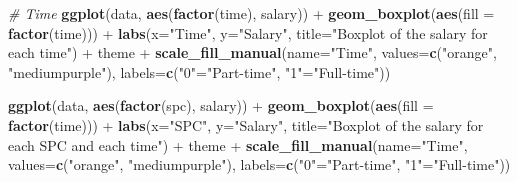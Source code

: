 \documentclass[]{article}
\newenvironment{Shaded}{\begin{snugshade}}{\end{snugshade}}
\newcommand{\KeywordTok}[1]{\textcolor[rgb]{0.13,0.29,0.53}{\textbf{{#1}}}}
\newcommand{\DataTypeTok}[1]{\textcolor[rgb]{0.13,0.29,0.53}{{#1}}}
\newcommand{\StringTok}[1]{\textcolor[rgb]{0.31,0.60,0.02}{{#1}}}
\newcommand{\CommentTok}[1]{\textcolor[rgb]{0.56,0.35,0.01}{\textit{{#1}}}}
\newcommand{\NormalTok}[1]{{#1}}
\begin{document}
\begin{Shaded}
\begin{Highlighting}[]
\CommentTok{# Time}
\KeywordTok{ggplot}\NormalTok{(data, }\KeywordTok{aes}\NormalTok{(}\KeywordTok{factor}\NormalTok{(time), salary)) +}\StringTok{ }\KeywordTok{geom_boxplot}\NormalTok{(}\KeywordTok{aes}\NormalTok{(}\DataTypeTok{fill =} \KeywordTok{factor}\NormalTok{(time))) +}
\StringTok{  }\KeywordTok{labs}\NormalTok{(}\DataTypeTok{x=}\StringTok{"Time"}\NormalTok{, }\DataTypeTok{y=}\StringTok{"Salary"}\NormalTok{, }\DataTypeTok{title=}\StringTok{"Boxplot of the salary for each time"}\NormalTok{) +}\StringTok{ }\NormalTok{theme +}
\StringTok{  }\KeywordTok{scale_fill_manual}\NormalTok{(}\DataTypeTok{name=}\StringTok{"Time"}\NormalTok{, }\DataTypeTok{values=}\KeywordTok{c}\NormalTok{(}\StringTok{"orange"}\NormalTok{, }\StringTok{"mediumpurple"}\NormalTok{), }\DataTypeTok{labels=}\KeywordTok{c}\NormalTok{(}\StringTok{"0"}\NormalTok{=}\StringTok{"Part-time"}\NormalTok{, }
  \StringTok{"1"}\NormalTok{=}\StringTok{"Full-time"}\NormalTok{))}
  
\KeywordTok{ggplot}\NormalTok{(data, }\KeywordTok{aes}\NormalTok{(}\KeywordTok{factor}\NormalTok{(spc), salary)) +}\StringTok{ }\KeywordTok{geom_boxplot}\NormalTok{(}\KeywordTok{aes}\NormalTok{(}\DataTypeTok{fill =} \KeywordTok{factor}\NormalTok{(time))) +}
\StringTok{  }\KeywordTok{labs}\NormalTok{(}\DataTypeTok{x=}\StringTok{"SPC"}\NormalTok{, }\DataTypeTok{y=}\StringTok{"Salary"}\NormalTok{, }\DataTypeTok{title=}\StringTok{"Boxplot of the salary for each SPC and each time"}\NormalTok{) +}\StringTok{ }
\StringTok{  }\NormalTok{theme +}\StringTok{ }\KeywordTok{scale_fill_manual}\NormalTok{(}\DataTypeTok{name=}\StringTok{"Time"}\NormalTok{, }\DataTypeTok{values=}\KeywordTok{c}\NormalTok{(}\StringTok{"orange"}\NormalTok{, }\StringTok{"mediumpurple"}\NormalTok{), }\DataTypeTok{labels=}\KeywordTok{c}\NormalTok{(}\StringTok{"0"}\NormalTok{=}\StringTok{"Part-time"}\NormalTok{, }
  \StringTok{"1"}\NormalTok{=}\StringTok{"Full-time"}\NormalTok{))}


\end{Highlighting}
\end{Shaded}
\end{document}
